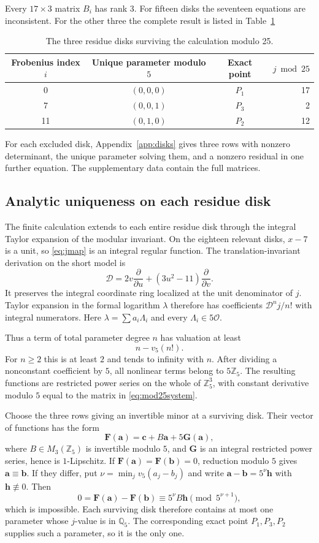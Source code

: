 \documentclass[11pt,a4paper]{article}
\theoremstyle{definition}\newtheorem{definition}[theorem]{Definition}
\theoremstyle{remark}\newtheorem{remark}[theorem]{Remark}
\newcommand{\Q}{\mathbb Q}\newcommand{\Z}{\mathbb Z}\newcommand{\F}{\mathbb F}
\newcommand{\OO}{\mathcal O}\newcommand{\Cl}{\operatorname{Cl}}
\begin{document}
Every $17\times3$ matrix $B_i$ has rank $3$. For fifteen disks the
seventeen equations are inconsistent. For the other three the complete result is listed in Table~\ref{tab:9}
\begin{table}[htbp]
\centering\caption{The three residue disks surviving the calculation modulo 25.}\label{tab:9}
\begin{tabular}{cccr}
\toprule
Frobenius index $i$&Unique parameter modulo $5$&Exact point&$j\bmod25$\\\midrule
0&$(0,0,0)$&$P_1$&17\\
7&$(0,0,1)$&$P_3$&2\\
11&$(0,1,0)$&$P_2$&12\\\bottomrule
\end{tabular}
\end{table}
For each excluded disk, Appendix~\ref{app:disks} gives three rows with nonzero determinant, the unique parameter solving them, and a nonzero residual in one further equation. The supplementary data contain the full matrices.

\subsection{Analytic uniqueness on each residue disk}

The finite calculation extends to each entire residue disk through the integral Taylor expansion of the modular invariant. On the eighteen relevant disks, $x-7$ is a unit, so \eqref{eq:jmap} is an integral regular function. The translation-invariant derivation on the short model is
\[
\mathcal D=2v\frac\partial{\partial u}
 +(3u^2-11)\frac\partial{\partial v}.
\]
It preserves the integral coordinate ring localized at the unit
denominator of $j$. Taylor expansion in the formal logarithm $\lambda$
therefore has coefficients $\mathcal D^n j/n!$ with integral numerators.
Here $\lambda=\sum a_i\Lambda_i$ and every $\Lambda_i\in5\OO$.


Thus a term of total parameter degree $n$ has valuation at least
\[
n-v_5(n!).
\]
For $n\ge2$ this is at least $2$ and tends to infinity with $n$.
After dividing a nonconstant coefficient by $5$, all nonlinear terms
belong to $5\Z_5$. The resulting functions are restricted power series
on the whole of $\Z_5^3$, with constant derivative modulo $5$ equal
to the matrix in \eqref{eq:mod25system}.

Choose the three rows giving an invertible minor at a surviving disk.
Their vector of functions has the form
\[
\mathbf F(\mathbf a)=\mathbf c+B\mathbf a+5\mathbf G(\mathbf a),
\]
where $B\in M_3(\Z_5)$ is invertible modulo $5$, and $\mathbf G$
is an integral restricted power series, hence is $1$-Lipschitz.
If $\mathbf F(\mathbf a)=\mathbf F(\mathbf b)=0$, reduction modulo
$5$ gives $\mathbf a\equiv\mathbf b$. If they differ, put
$\nu=\min_jv_5(a_j-b_j)$ and write
$\mathbf a-\mathbf b=5^\nu\mathbf h$ with $\mathbf h\not\equiv0$.
Then
\[
0=\mathbf F(\mathbf a)-\mathbf F(\mathbf b)
 \equiv5^\nu B\mathbf h\pmod{5^{\nu+1}},
\]
which is impossible. Each surviving disk therefore contains at most one
parameter whose $j$-value is in $\Q_5$. The corresponding exact point
$P_1,P_3,P_2$ supplies such a parameter, so it is the only one.
\end{document}
